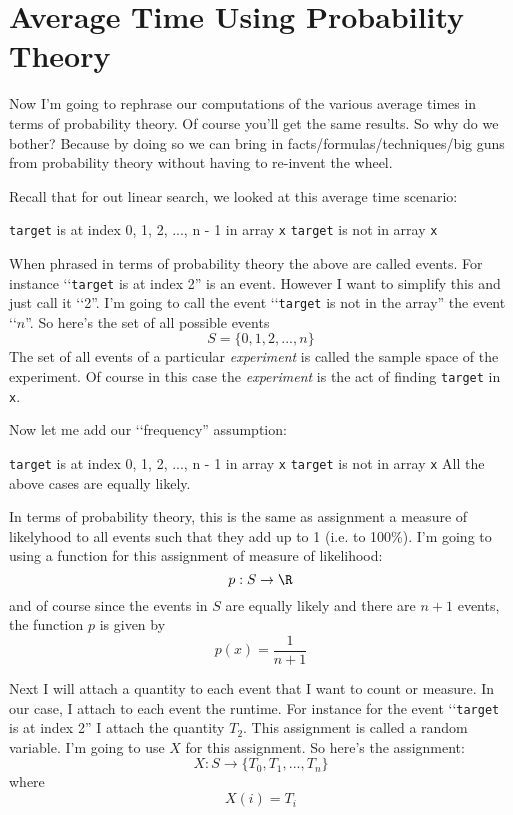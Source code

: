 \section{Average Time Using Probability Theory}

Now I'm going to rephrase our computations of the various
average times in terms of probability theory.
Of course you'll get the same results.
So why do we bother?
Because by doing so we can bring in facts/formulas/techniques/big guns
from probability theory without having to re-invent the wheel.

Recall that for out linear search, we looked at this average time scenario:
\begin{itemize}
\li \verb!target! is at index 0, 1, 2, ..., n - 1 in array \verb!x!
\li \verb!target! is not in array \verb!x!
\end{itemize}
When phrased in terms of probability theory the above are called
events.
For instance \lq\lq \verb!target! is at index 2'' is an event.
However I want to simplify this and just call it \lq\lq 2''.
I'm going to call the event \lq\lq \verb!target! is not in the array''
the event \lq\lq $n$''.
So here's the set of all possible events
\[
S = \{0, 1, 2, ..., n\}
\]
The set of all events of a particular \textit{experiment} is called
the sample space of the experiment.
Of course in this case the \textit{experiment} is the act of finding
\verb!target! in \verb!x!.

Now let me add our \lq\lq frequency'' assumption:
\begin{itemize}
\li \verb!target! is at index 0, 1, 2, ..., n - 1 in array \verb!x!
\li \verb!target! is not in array \verb!x!
\li All the above cases are equally likely.
\end{itemize}

In terms of probability theory, this is the same as assignment a measure
of likelyhood to all events such that they add up to 1 (i.e. to 100\%).
I'm going to using a function for this assignment of measure of likelihood:
\[
p: S \rightarrow \R
\]
and of course since the events in $S$ are equally likely and there are 
$n + 1$
events, the function $p$ is given by
\[
p(x) = \frac{1}{n + 1}
\]

Next I will attach a quantity to each event that I want to count or measure.
In our case, I attach to each event the runtime.
For instance for the event \lq\lq \verb!target! is at index 2''
I attach the quantity $T_2$.
This assignment is called a random variable.
I'm going to use $X$ for this assignment.
So here's the assignment:
\[
X: S \rightarrow \{T_0, T_1, ..., T_n\}
\]
where
\[
X(i) = T_i
\]

